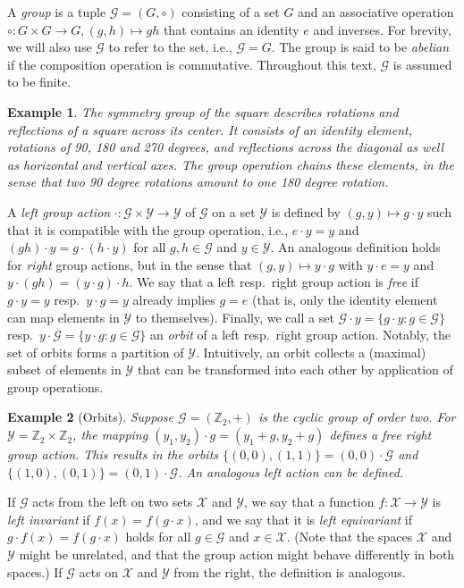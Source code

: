 \documentclass[preprint,12pt,authoryear]{elsarticle}
\newcommand{\Z}{\mathbb Z}
\newcommand\Gc{\mathcal G}
\newcommand\Yc{\mathcal Y}
\newcommand\Xc{\mathcal X}
\newtheorem{example}{Example}[section]%
\begin{document}
{A \emph{group} is a tuple $\Gc = (G,\circ)$ consisting of a set $G$ and an associative operation $\circ: G \times G \rightarrow G, (g,h) \mapsto gh$ that contains an identity $e$ and inverses. For brevity, we will also use $\Gc$ to refer to the set, i.e., $\Gc = G$.
The group is said to be \emph{abelian} if the composition operation is commutative. Throughout this text, $\Gc$ is assumed to be finite.

\begin{example}
    The symmetry group of the square describes rotations and reflections of a square across its center. It consists of an identity element, rotations of 90, 180 and 270 degrees, and reflections across the diagonal as well as horizontal and vertical axes. The group operation chains these elements, in the sense that two 90 degree rotations amount to one 180 degree rotation.
\end{example}


A \emph{left group action} $\cdot: \Gc \times \Yc \rightarrow \Yc$ of $\Gc$ on a set $\Yc$ is defined by $(g,y) \mapsto g \cdot y$ such that it is compatible with the group operation, i.e., $e \cdot y = y$ and $(g h) \cdot y = g \cdot (h \cdot y)$ for all $g, h \in \Gc$ and $y \in \Yc$. An analogous definition holds for \emph{right} group actions, but in the sense that $(g,y) \mapsto y \cdot g$ with $y \cdot e = y$ and $y \cdot (g h) = (y \cdot g) \cdot h$.
We say that a left resp.\ right group action is \emph{free} if $g \cdot y = y$ resp.\  $y \cdot g = y$ already implies $g = e$ (that is, only the identity element can map elements in $\Yc$ to themselves). Finally, we call a set $\Gc \cdot y = \{ g \cdot y : g \in \Gc \}$ resp.\  $y \cdot \Gc = \{ y \cdot g : g \in \Gc \}$ an \emph{orbit} of a left resp.\ right group action. Notably, the set of orbits forms a partition of $\Yc$. Intuitively, an orbit collects a (maximal) subset of elements in $\Yc$ that can be transformed into each other by application of group operations. 


\begin{example}[Orbits]
    \label{ex:orbits}
    Suppose $\Gc = (\Z_2,+)$ is the cyclic group of order two. For $\Yc = \Z_2 \times \Z_2$, the mapping $(y_1,y_2)\cdot g = (y_1 + g, y_2 + g)$ defines a free right group action. This results in the orbits $\{ (0,0), (1,1) \} = (0,0) \cdot \Gc$ and $\{ (1,0), (0,1) \} = (0,1) \cdot \Gc$. An analogous left action can be defined.
\end{example}

If $\Gc$ acts from the left on two sets $\Xc$ and $\Yc$, we say that a function $f : \Xc \rightarrow \Yc$ is \emph{left invariant} if $f(x) = f(g \cdot x)$, and we say that it is \emph{left equivariant} if $g \cdot f(x) = f(g \cdot x)$ holds for all $g \in \Gc$ and $x \in \Xc$. (Note that the spaces $\Xc$ and $\Yc$ might be unrelated, and that the group action might behave differently in both spaces.) If $\Gc$ acts on $\Xc$ and $\Yc$ from the right, the definition is analogous.



}
\end{document}
